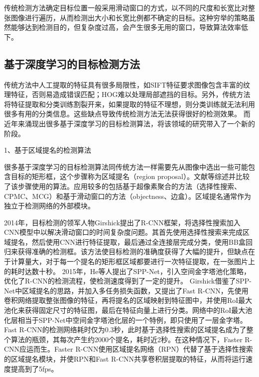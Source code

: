 传统检测方法确定目标位置一般采用滑动窗口的方式，以不同的尺度和长宽比对整张图像进行遍历，从而检测出大小和长宽比例都不确定的目标。这种穷举的策略虽然能够达到检测目的，但复杂度过高，会产生很多无用的窗口，导致算法效率低下。

\subsection{基于深度学习的目标检测方法}
传统方法中人工提取的特征具有很多局限性，如SIFT特征要求图像包含丰富的纹理特征，否则易造成错误匹配；HOG难以处理局部遮挡的目标。另外，传统方法将特征提取和分类训练割裂开来，如果提取的特征不理想，则分类训练就无法利用很多有用的分类信息。这些缺点导致传统检测方法无法获得很好的检测效果。
而近年来涌现出很多基于深度学习的目标检测算法，将该领域的研究带入了一个新的阶段。

1、基于区域提名的检测算法

很多基于深度学习的目标检测算法同传统方法一样需要先从图像中选出一些可能包含目标的矩形框，这个步骤称为区域提名（region proposal）。文献\cite{hosang2014good, hosang2016makes, chavali2016object}等综述并比较了该步骤使用的算法。应用较多的包括基于超像素聚合的方法（选择性搜索\cite{uijlings2013selective}、CPMC\cite{carreira2012cpmc}、MCG\cite{arbelaez2014multiscale}）和基于滑动窗口的方法（objectness\cite{alexe2012measuring}、边盒\cite{zitnick2014edge}）。区域提名通常作为独立于检测网络的外部模块。

2014年，目标检测的领军人物Girshick提出了R-CNN框架\cite{girshick2014rich}，将选择性搜索加入CNN模型中以解决滑动窗口的时间复杂度问题。其首先使用选择性搜索来完成区域提名，然后使用CNN进行特征提取，最后通过全连接层完成分类，使用BB盒回归来获得准确的检测框。该方法使目标检测的准确度获得了大幅的提升，但缺点在于计算量大，对于每一个提名的矩形框区域都要进行一次特征提取，在一张图片上的耗时达数十秒。
2015年，He等人提出了SPP-Net\cite{he2014spatial}，引入空间金字塔池化策略，优化了R-CNN的检测流程，使检测速度得到了一定的提升。
Girshick借鉴了SPP-Net中区域提名的思路，并加入多任务损失函数，又提出了Fast R-CNN\cite{girshick2015fast}，先使用卷积网络提取整张图像的特征，再将提名的区域映射到特征图中，并使用RoI最大池化来获得固定尺寸的特征图，最后在特征向量上进行分类。网络中的RoI最大池化层相当于SPP-Net中空间金字塔池化层的一个特例，即只使用了一层金字塔。
Fast R-CNN的检测网络耗时仅为0.3秒，此时基于选择性搜索的区域提名成为了整个算法的瓶颈，其每次产生约2000个提名，耗时近2秒。在这种情况下，Faster R-CNN\cite{ren2015faster}应运而生。Faster R-CNN使用区域提名网络（RPN）代替了基于选择性搜索的区域提名模块，并使RPN和Fast R-CNN共享卷积层提取的特征，从而将运行速度提高到了5fps。



